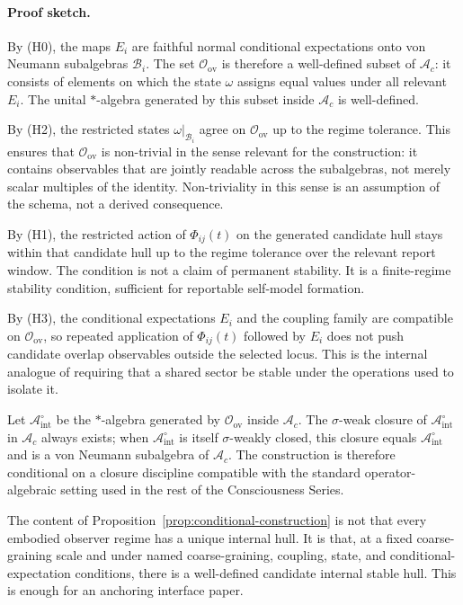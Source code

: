 \documentclass[12pt]{article}
\theoremstyle{definition}
\theoremstyle{remark}
\newcommand{\Ac}{\mathcal A_c}
\newcommand{\Bintpre}{\mathcal A_{\mathrm{int}}^{\circ}}
\begin{document}
\paragraph{Proof sketch.}
By (H0), the maps \(E_i\) are faithful normal conditional expectations
onto von Neumann subalgebras \(\mathcal B_i\). The set
\(\mathcal O_{\mathrm{ov}}\) is therefore a well-defined subset of
\(\Ac\): it consists of elements on which the state \(\omega\) assigns
equal values under all relevant \(E_i\). The unital \(*\)-algebra
generated by this subset inside \(\Ac\) is well-defined.

By (H2), the restricted states \(\omega|_{\mathcal B_i}\) agree on
\(\mathcal O_{\mathrm{ov}}\) up to the regime tolerance. This ensures
that \(\mathcal O_{\mathrm{ov}}\) is non-trivial in the sense relevant
for the construction: it contains observables that are jointly readable
across the subalgebras, not merely scalar multiples of the identity.
Non-triviality in this sense is an assumption of the schema, not a
derived consequence.

By (H1), the restricted action of \(\Phi_{ij}(t)\) on the generated
candidate hull stays within that candidate hull up to the regime
tolerance over the relevant report window. The condition is not a claim
of permanent stability. It is a finite-regime stability condition,
sufficient for reportable self-model formation.

By (H3), the conditional expectations \(E_i\) and the coupling family are
compatible on \(\mathcal O_{\mathrm{ov}}\), so repeated application of
\(\Phi_{ij}(t)\) followed by \(E_i\) does not push candidate overlap
observables outside the selected locus. This is the internal analogue
of requiring that a shared sector be stable under the operations used
to isolate it.

Let \(\Bintpre\) be the \(*\)-algebra generated by
\(\mathcal O_{\mathrm{ov}}\) inside \(\Ac\). The \(\sigma\)-weak
closure of \(\Bintpre\) in \(\Ac\) always exists; when \(\Bintpre\)
is itself \(\sigma\)-weakly closed, this closure equals \(\Bintpre\)
and is a von Neumann subalgebra of \(\Ac\).
The construction is therefore conditional on a closure discipline
compatible with the standard operator-algebraic setting used in the
rest of the Consciousness Series.

The content of Proposition~\ref{prop:conditional-construction} is not
that every embodied observer regime has a unique internal hull. It is
that, at a fixed coarse-graining scale and under named coarse-graining,
coupling, state, and conditional-expectation conditions, there is a
well-defined candidate internal stable hull. This is enough for an anchoring
interface paper.
\end{document}
